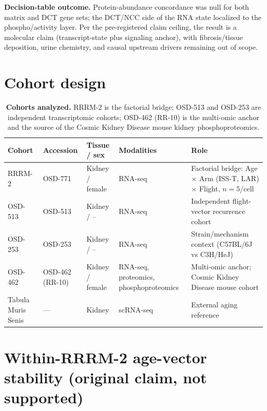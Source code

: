 \documentclass[10pt]{article}
\begin{document}
\noindent
\textbf{Decision-table outcome.} Protein-abundance concordance was null for both matrix and DCT gene sets; the DCT/NCC side of the RNA state localized to the phospho/activity layer. Per the pre-registered claim ceiling, the result is a molecular claim (transcript-state plus signaling anchor), with fibrosis/tissue deposition, urine chemistry, and causal upstream drivers remaining out of scope.

\section{Cohort design}

\begin{table}[H]
\centering\footnotesize
\caption{\textbf{Cohorts analyzed.} RRRM-2 is the factorial bridge; OSD-513 and OSD-253 are independent transcriptomic cohorts; OSD-462 (RR-10) is the multi-omic anchor and the source of the Cosmic Kidney Disease mouse kidney phosphoproteomics.}
\label{tab:cohorts}
\begin{tabularx}{\textwidth}{>{\raggedright\arraybackslash}p{} >{\raggedright\arraybackslash}p{} >{\raggedright\arraybackslash}p{} >{\raggedright\arraybackslash}p{} X}
\toprule
Cohort & Accession & Tissue / sex & Modalities & Role \\
\midrule
RRRM-2 & OSD-771 & Kidney / female & RNA-seq & Factorial bridge: Age $\times$ Arm (ISS-T, LAR) $\times$ Flight, $n=5$/cell \\
OSD-513 & OSD-513 & Kidney / -- & RNA-seq & Independent flight-vector recurrence cohort \\
OSD-253 & OSD-253 & Kidney / -- & RNA-seq & Strain/mechanism context (C57BL/6J vs C3H/HeJ) \\
OSD-462 & OSD-462 (RR-10) & Kidney / female & RNA-seq, proteomics, phosphoproteomics & Multi-omic anchor; Cosmic Kidney Disease mouse cohort \\
Tabula Muris Senis & --- & Kidney & scRNA-seq & External aging reference \\
\bottomrule
\end{tabularx}
\end{table}

\section{Within-RRRM-2 age-vector stability (original claim, not supported)}
\end{document}
